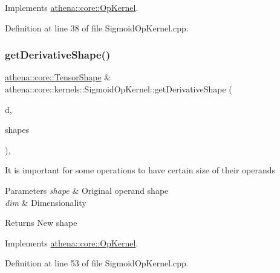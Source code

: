 Implements \mbox{\hyperlink{classathena_1_1core_1_1_op_kernel_ad500db1afc5a7c10acff8ecb8f1bee4d}{athena\+::core\+::\+Op\+Kernel}}.



Definition at line 38 of file Sigmoid\+Op\+Kernel.\+cpp.

\mbox{\label{classathena_1_1core_1_1kernels_1_1_sigmoid_op_kernel_a0ea18b43eb9355d7a855202898ff09fc}} 
\subsubsection{\texorpdfstring{get\+Derivative\+Shape()}{getDerivativeShape()}}
{\footnotesize\ttfamily \mbox{\hyperlink{classathena_1_1core_1_1_tensor_shape}{athena\+::core\+::\+Tensor\+Shape}} \& athena\+::core\+::kernels\+::\+Sigmoid\+Op\+Kernel\+::get\+Derivative\+Shape (\begin{DoxyParamCaption}\item[{int}]{d,  }\item[{std\+::vector$<$ \mbox{\hyperlink{classathena_1_1core_1_1_tensor_shape}{athena\+::core\+::\+Tensor\+Shape}} $>$ \&}]{shapes }\end{DoxyParamCaption})\hspace{0.3cm}{\ttfamily [override]}, {\ttfamily [virtual]}}

It is important for some operations to have certain size of their operands 
\begin{DoxyParams}{Parameters}
{\em shape} & Original operand shape \\
\hline
{\em dim} & Dimensionality \\
\hline
\end{DoxyParams}
\begin{DoxyReturn}{Returns}
New shape 
\end{DoxyReturn}


Implements \mbox{\hyperlink{classathena_1_1core_1_1_op_kernel_ad95af6dd184ce7ee9182ec7ca54b6c4d}{athena\+::core\+::\+Op\+Kernel}}.



Definition at line 53 of file Sigmoid\+Op\+Kernel.\+cpp.

